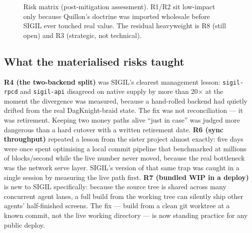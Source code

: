 \begin{figure}[h]
\centering
{}
\caption{Risk matrix (post-mitigation assessment). R1/R2 sit low-impact only because Quillon's doctrine was imported wholesale before SIGIL ever touched real value. The residual heavyweight is R8 (still open) and R3 (strategic, not technical).}
\label{fig:riskmatrix}
\end{figure}

\subsection{What the materialised risks taught}

\textbf{R4 (the two-backend split)} was SIGIL's clearest management lesson: \texttt{sigil-rpcd} and \texttt{sigil-api} disagreed on native supply by more than 20$\times$ at the moment the divergence was measured, because a hand-rolled backend had quietly drifted from the real DagKnight-braid state. The fix was not reconciliation --- it was retirement. Keeping two money paths alive ``just in case'' was judged more dangerous than a hard cutover with a written retirement date. \textbf{R6 (sync throughput)} repeated a lesson from the sister project almost exactly: five days were once spent optimising a local commit pipeline that benchmarked at millions of blocks/second while the live number never moved, because the real bottleneck was the network serve layer. SIGIL's version of that same trap was caught in a single session by measuring the live path first. \textbf{R7 (bundled WIP in a deploy)} is new to SIGIL specifically: because the source tree is shared across many concurrent agent lanes, a full build from the working tree can silently ship other agents' half-finished screens. The fix --- build from a clean git worktree at a known commit, not the live working directory --- is now standing practice for any public deploy.

